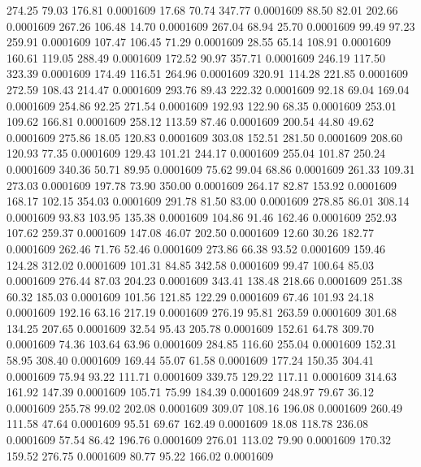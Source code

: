  274.25   79.03  176.81   0.0001609
  17.68   70.74  347.77   0.0001609
  88.50   82.01  202.66   0.0001609
 267.26  106.48   14.70   0.0001609
 267.04   68.94   25.70   0.0001609
  99.49   97.23  259.91   0.0001609
 107.47  106.45   71.29   0.0001609
  28.55   65.14  108.91   0.0001609
 160.61  119.05  288.49   0.0001609
 172.52   90.97  357.71   0.0001609
 246.19  117.50  323.39   0.0001609
 174.49  116.51  264.96   0.0001609
 320.91  114.28  221.85   0.0001609
 272.59  108.43  214.47   0.0001609
 293.76   89.43  222.32   0.0001609
  92.18   69.04  169.04   0.0001609
 254.86   92.25  271.54   0.0001609
 192.93  122.90   68.35   0.0001609
 253.01  109.62  166.81   0.0001609
 258.12  113.59   87.46   0.0001609
 200.54   44.80   49.62   0.0001609
 275.86   18.05  120.83   0.0001609
 303.08  152.51  281.50   0.0001609
 208.60  120.93   77.35   0.0001609
 129.43  101.21  244.17   0.0001609
 255.04  101.87  250.24   0.0001609
 340.36   50.71   89.95   0.0001609
  75.62   99.04   68.86   0.0001609
 261.33  109.31  273.03   0.0001609
 197.78   73.90  350.00   0.0001609
 264.17   82.87  153.92   0.0001609
 168.17  102.15  354.03   0.0001609
 291.78   81.50   83.00   0.0001609
 278.85   86.01  308.14   0.0001609
  93.83  103.95  135.38   0.0001609
 104.86   91.46  162.46   0.0001609
 252.93  107.62  259.37   0.0001609
 147.08   46.07  202.50   0.0001609
  12.60   30.26  182.77   0.0001609
 262.46   71.76   52.46   0.0001609
 273.86   66.38   93.52   0.0001609
 159.46  124.28  312.02   0.0001609
 101.31   84.85  342.58   0.0001609
  99.47  100.64   85.03   0.0001609
 276.44   87.03  204.23   0.0001609
 343.41  138.48  218.66   0.0001609
 251.38   60.32  185.03   0.0001609
 101.56  121.85  122.29   0.0001609
  67.46  101.93   24.18   0.0001609
 192.16   63.16  217.19   0.0001609
 276.19   95.81  263.59   0.0001609
 301.68  134.25  207.65   0.0001609
  32.54   95.43  205.78   0.0001609
 152.61   64.78  309.70   0.0001609
  74.36  103.64   63.96   0.0001609
 284.85  116.60  255.04   0.0001609
 152.31   58.95  308.40   0.0001609
 169.44   55.07   61.58   0.0001609
 177.24  150.35  304.41   0.0001609
  75.94   93.22  111.71   0.0001609
 339.75  129.22  117.11   0.0001609
 314.63  161.92  147.39   0.0001609
 105.71   75.99  184.39   0.0001609
 248.97   79.67   36.12   0.0001609
 255.78   99.02  202.08   0.0001609
 309.07  108.16  196.08   0.0001609
 260.49  111.58   47.64   0.0001609
  95.51   69.67  162.49   0.0001609
  18.08  118.78  236.08   0.0001609
  57.54   86.42  196.76   0.0001609
 276.01  113.02   79.90   0.0001609
 170.32  159.52  276.75   0.0001609
  80.77   95.22  166.02   0.0001609
